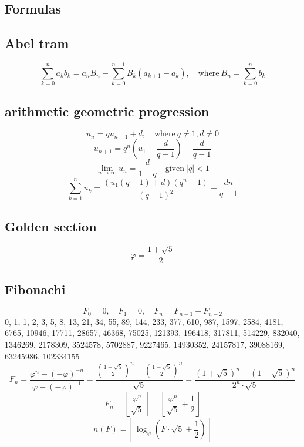 \documentclass[11.5pt,a4paper,landscape,oneside]{amsart}
\newcommand{\Sequence}[1]{\subsection{#1}}
\newcommand{\Term}[1]{\subsection{#1}}
\begin{document}
\begin{multicols*}{2}
	\section{Formulas}
	\Term{Abel tram}
	\begin{equation}
		\sum_{k=0}^n a_k b_k=a_n B_n - \sum_{k=0}^{n-1} B_k (a_{k+1} - a_k),\quad\text{where}\ B_n = \sum_{k=0}^n b_k
	\end{equation}
	\Term{arithmetic geometric progression}
	\begin{equation}
		u_{n}=qu_{n-1}+d,\quad\text{where}\ q\ne 1, d\ne 0
	\end{equation}
	\begin{equation}
		u_{n+1} = q^{n}\left(u_{1}+\frac{d}{q-1}\right)- \frac{d}{q-1}
	\end{equation}
	\begin{equation}
		\lim\limits_{n\to\infty}u_{n}=\frac{d}{1-q}\quad\text{given}\ \lvert q\rvert<1
	\end{equation}
	\begin{equation}
		\sum_{k=1}^{n}u_{k} = \frac{(u_{1}(q-1)+d)(q^n-1)}{(q-1)^2}-\frac{dn}{q-1}
	\end{equation}
	\Term{Golden section}
	\begin{equation}
		\varphi=\frac{1+\sqrt{5}}{2}
	\end{equation}
	\Sequence{Fibonachi}
	\begin{equation}
		F_0=0,\quad F_1=0,\quad F_{n}=F_{n-1}+F_{n-2}
	\end{equation}
	0, 1, 1, 2, 3, 5, 8, 13, 21, 34, 55, 89, 144, 233, 377, 610, 987, 1597, 2584, 4181, 6765, 10946, 17711, 28657, 46368, 75025, 121393, 196418, 317811, 514229, 832040, 1346269, 2178309, 3524578, 5702887, 9227465, 14930352, 24157817, 39088169, 63245986, 102334155
	\begin{equation}
		F_{n}=\frac{\varphi^n - (-\varphi)^{-n}}{\varphi - (-\varphi)^{-1}}=\frac{\left(\frac{1 + \sqrt{5}}{2}\right)^n - \left(\frac{1-\sqrt{5}}{2}\right)^n}{\sqrt{5}} = \frac{(1+\sqrt{5})^n-(1-\sqrt{5})^n}{2^n\cdot\sqrt{5}}
	\end{equation}
	\begin{equation}
		F_n = \left\lfloor\frac{\varphi^n}{\sqrt{5}}\right\rceil=\left\lfloor\frac{\varphi^n}{\sqrt{5}}+\frac{1}{2}\right\rfloor
	\end{equation}
	\begin{equation}
		n(F) = \left\lfloor \log_\varphi \left(F\cdot\sqrt{5} + \frac{1}{2}\right) \right\rfloor
	\end{equation}
	\begin{equation}

\end{equation}
\end{multicols*}
\end{document}
